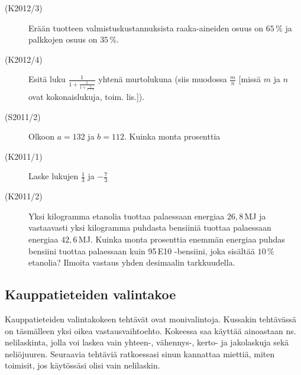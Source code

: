 \begin{description}
	\item[(K2012/3)] Erään tuotteen valmistuskustannuksista raaka-aineiden osuus on $65$\,\% ja palkkojen osuus on $35$\,\%.
        

	\item[(K2012/4)] Esitä luku $\frac{1}{1+\frac{1}{1+\frac{1}{1+1}}}$ yhtenä murtolukuna (siis muodossa $\frac{m}{n}$ [missä $m$ ja $n$ ovat kokonaislukuja, toim. lis.]).
	\item[(S2011/2)] Olkoon $a=132$ ja  $b=112$. Kuinka monta prosenttia 
	\item[(K2011/1)] Laske lukujen $\frac{1}{3}$ ja $-\frac{7}{3}$
	\item[(K2011/2)] Yksi kilogramma etanolia tuottaa palaessaan energiaa $26,8$\,MJ ja vastaavasti yksi kilogramma puhdasta bensiiniä tuottaa palaessaan energiaa $42,6$\,MJ. Kuinka monta prosenttia enemmän energiaa puhdas bensiini tuottaa palaessaan kuin 95\,E10 -bensiini, joka sisältää $10$\,\% etanolia? Ilmoita vastaus yhden desimaalin tarkkuudella. 
\end{description}

\subsection*{Kauppatieteiden valintakoe}

Kauppatieteiden valintakokeen tehtävät ovat monivalintoja. Kussakin tehtävässä on täsmälleen yksi oikea vastausvaihtoehto. Kokeessa saa käyttää ainoastaan ns. nelilaskinta, jolla voi laskea vain yhteen-, vähennys-, kerto- ja jakolaskuja sekä neliöjuuren. Seuraavia tehtäviä ratkoessasi sinun kannattaa miettiä, miten toimisit, jos käytössäsi olisi vain nelilaskin.

